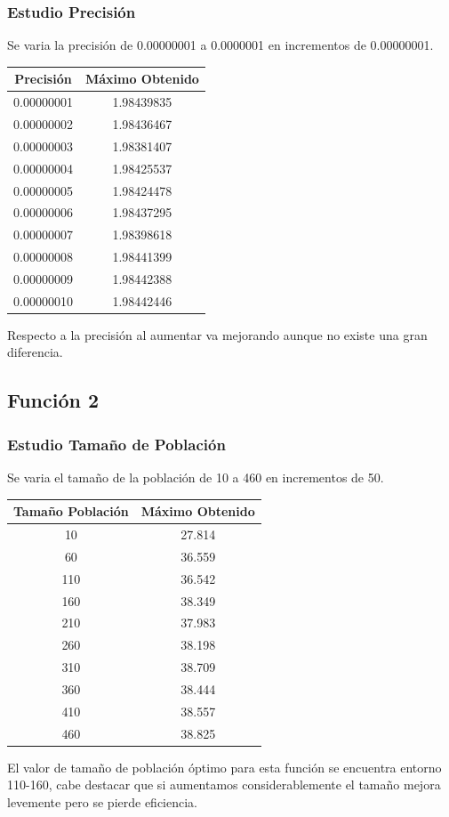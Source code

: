 \documentclass[12pt]{article}
\begin{document}
\subsubsection*{Estudio Precisión}
	Se varia la precisión de 0.00000001 a 0.0000001 en incrementos de 0.00000001.
\begin{table}[H]
\begin{center}
\begin{tabular}{|cc|} \hline
Precisión & Máximo Obtenido \\  \hline
0.00000001 & 1.98439835 \\ 
0.00000002 & 1.98436467 \\ 
0.00000003 & 1.98381407 \\
0.00000004 & 1.98425537 \\
0.00000005 & 1.98424478 \\
0.00000006 & 1.98437295 \\
0.00000007 & 1.98398618 \\
0.00000008 & 1.98441399 \\ 
0.00000009 & 1.98442388 \\
0.00000010 & 1.98442446 \\  \hline
\end{tabular}
\end{center}
\end{table}
	Respecto a la precisión al aumentar va mejorando aunque no existe una gran diferencia.

\subsection{Función 2}
\subsubsection*{Estudio Tamaño de Población}
	Se varia el tamaño de la población de 10 a 460 en incrementos de 50.
\begin{table}[H]
\begin{center}
\begin{tabular}{|cc|} \hline
Tamaño Población & Máximo Obtenido \\  \hline
10  & 27.814 \\ 
60  & 36.559 \\ 
110 & 36.542 \\
160 & 38.349 \\
210 & 37.983 \\
260 & 38.198 \\
310 & 38.709 \\
360 & 38.444 \\ 
410 & 38.557 \\
460 & 38.825 \\  \hline
\end{tabular}
\end{center}
\end{table}
	El valor de tamaño de población óptimo para esta función se encuentra entorno 110-160, cabe destacar que si aumentamos considerablemente el tamaño mejora levemente pero se pierde eficiencia.
\end{document}
